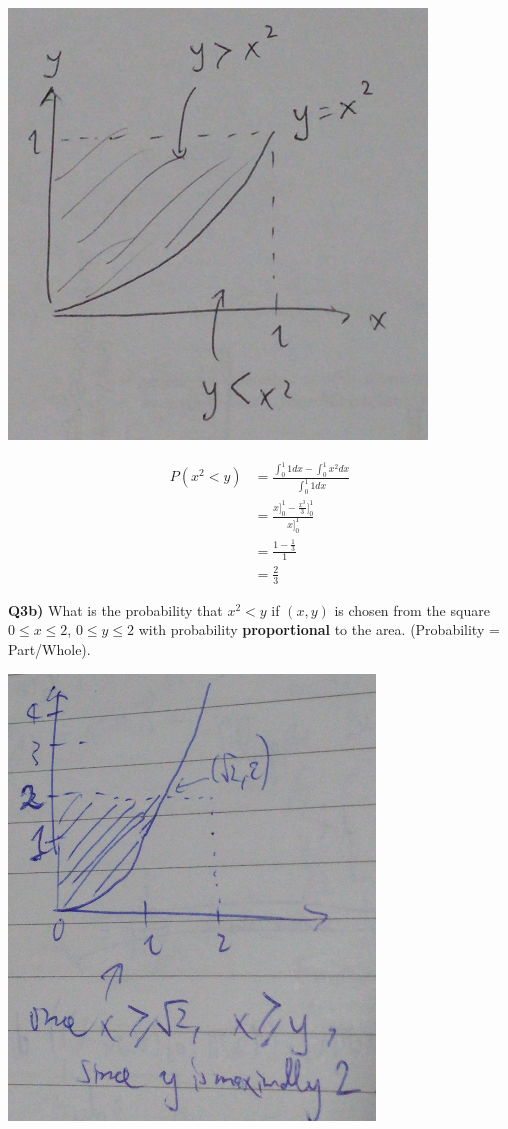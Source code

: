 \documentclass[9pt]{article}
\begin{document}
\begin{center}
  \includegraphics[scale=0.4]{q3a.jpg}
\end{center}

\begin{align*}
  P(x^2 < y) &= \frac{\int_0^1 1 dx - \int_0^1 x^2 dx}{\int_0^1 1 dx} \\
  &= \frac{x \bigg]_0^1 - \frac{x^3}{3}\bigg]_0^1}{x \bigg]_0^1} \\
  &= \frac{1 - \frac{1}{3}}{1} \\
  &= \frac{2}{3}
\end{align*}


\begin{tcolorbox}
  \textbf{Q3b)} What is the probability that $x^2 < y$ if $(x, y)$ is chosen from the square $0 \leq x \leq 2$, $0 \leq y \leq 2$ with probability \textbf{proportional} to the area. (Probability = Part/Whole).
\end{tcolorbox}

\begin{center}
  \includegraphics[scale=0.5]{q3b.jpg}
\end{center}
\end{document}
